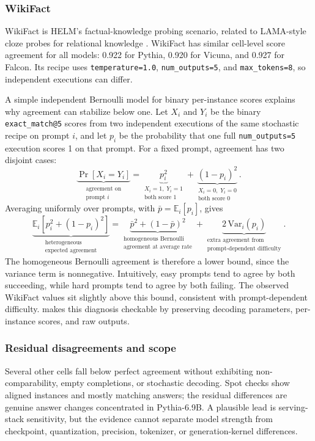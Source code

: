 \subsubsection{WikiFact}
\label{sec:app-helm-wikifact}

WikiFact is HELM's factual-knowledge probing scenario, related to LAMA-style
cloze probes for relational knowledge \citep{helm,petroni-etal-2019-language}.
WikiFact has similar cell-level score agreement for all models: 0.922 for
Pythia, 0.920 for Vicuna, and 0.927 for Falcon. Its recipe uses
\texttt{temperature=1.0}, \texttt{num\_outputs=5}, and
\texttt{max\_tokens=8}, so independent executions can differ.


A simple independent Bernoulli model for binary per-instance scores explains
why agreement can stabilize below one. Let \(X_i\) and \(Y_i\) be the binary
\texttt{exact\_match@5} scores from two independent executions of the same
stochastic recipe on prompt \(i\), and let \(p_i\) be the probability that one
full \texttt{num\_outputs=5} execution scores 1 on that prompt. For a fixed
prompt, agreement has two disjoint cases:
\[
  \underbrace{\Pr[X_i = Y_i]}_{\substack{
    \text{agreement on}\\
    \text{prompt }i
  }}
  =
  \underbrace{p_i^2}_{\substack{
    X_i=1,\;Y_i=1\\
    \text{both score }1
  }}
  +
  \underbrace{(1-p_i)^2}_{\substack{
    X_i=0,\;Y_i=0\\
    \text{both score }0
  }}.
\]
Averaging uniformly over prompts, with
\(\bar p = \mathbb{E}_i[p_i]\), gives
\[
  \underbrace{\mathbb{E}_i[p_i^2 + (1-p_i)^2]}_{\substack{
    \text{heterogeneous}\\
    \text{expected agreement}
  }}
  =
  \underbrace{
    \bar p^2 + (1-\bar p)^2
  }_{\substack{
    \text{homogeneous Bernoulli}\\
    \text{agreement at average rate}
  }}
  +
  \underbrace{2\,\mathrm{Var}_i(p_i)}_{\substack{
    \text{extra agreement from}\\
    \text{prompt-dependent difficulty}
  }}.
\]
The homogeneous Bernoulli agreement is therefore a lower bound, since the
variance term is nonnegative. Intuitively, easy prompts tend to agree by both
succeeding, while hard prompts tend to agree by both failing. The observed
WikiFact values sit slightly above this bound, consistent with prompt-dependent
difficulty. \eee{} makes this diagnosis checkable by preserving decoding
parameters, per-instance scores, and raw outputs.

\subsubsection{Residual disagreements and scope}
\label{sec:app-helm-residual}

Several other cells fall below perfect agreement without exhibiting
non-comparability, empty completions, or stochastic decoding. Spot checks show
aligned instances and mostly matching answers; the residual differences are
genuine answer changes concentrated in Pythia-6.9B. A plausible lead is
serving-stack sensitivity, but the evidence cannot separate model strength from
checkpoint, quantization, precision, tokenizer, or generation-kernel
differences.
